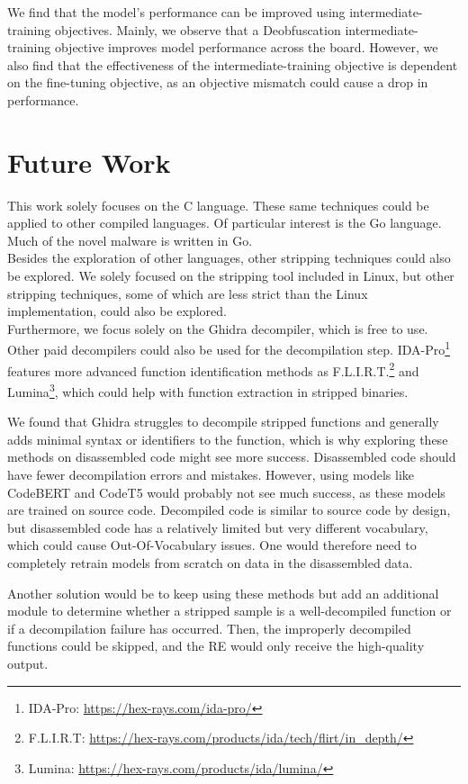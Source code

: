 We find that the model's performance can be improved using intermediate-training objectives. Mainly, we observe that a Deobfuscation intermediate-training objective improves model performance across the board. However, we also find that the effectiveness of the intermediate-training objective is dependent on the fine-tuning objective, as an objective mismatch could cause a drop in performance.

\section{Future Work}
This work solely focuses on the C language. These same techniques could be applied to other compiled languages. Of particular interest is the Go language. Much of the novel malware is written in Go.\\
Besides the exploration of other languages, other stripping techniques could also be explored. We solely focused on the stripping tool included in Linux, but other stripping techniques, some of which are less strict than the Linux implementation, could also be explored.\\

Furthermore, we focus solely on the Ghidra decompiler, which is free to use. Other paid decompilers could also be used for the decompilation step. IDA-Pro\footnote{IDA-Pro: \url{https://hex-rays.com/ida-pro/}} features more advanced function identification methods as F.L.I.R.T.\footnote{F.L.I.R.T: \url{https://hex-rays.com/products/ida/tech/flirt/in_depth/}} and Lumina\footnote{Lumina: \url{https://hex-rays.com/products/ida/lumina/}}, which could help with function extraction in stripped binaries.

We found that Ghidra struggles to decompile stripped functions and generally adds minimal syntax or identifiers to the function, which is why exploring these methods on disassembled code might see more success. Disassembled code should have fewer decompilation errors and mistakes. However, using models like CodeBERT and CodeT5 would probably not see much success, as these models are trained on source code. Decompiled code is similar to source code by design, but disassembled code has a relatively limited but very different vocabulary, which could cause Out-Of-Vocabulary issues. One would therefore need to completely retrain models from scratch on data in the disassembled data.

Another solution would be to keep using these methods but add an additional module to determine whether a stripped sample is a well-decompiled function or if a decompilation failure has occurred. Then, the improperly decompiled functions could be skipped, and the RE would only receive the high-quality output.

